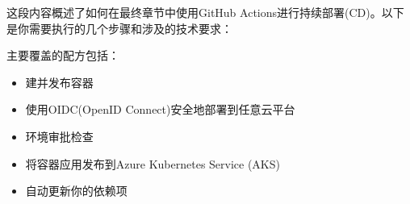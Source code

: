 这段内容概述了如何在最终章节中使用GitHub Actions进行持续部署(CD)。以下是你需要执行的几个步骤和涉及的技术要求：

主要覆盖的配方包括：

\begin{itemize}
\item 
建并发布容器

\item 
使用OIDC(OpenID Connect)安全地部署到任意云平台

\item 
环境审批检查

\item 
将容器应用发布到Azure Kubernetes Service (AKS)

\item 
自动更新你的依赖项
\end{itemize}